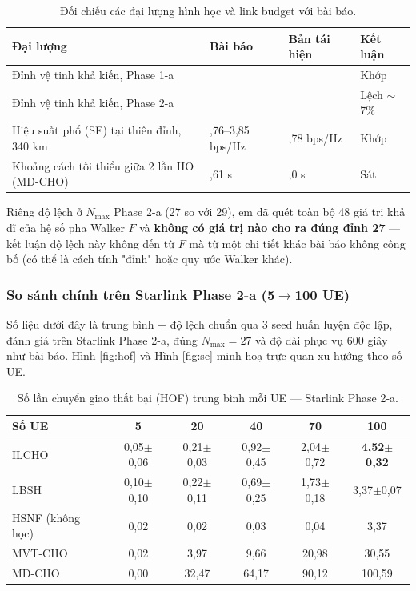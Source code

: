 \documentclass{article} %
\begin{document}
\begin{table}[h!]
\centering
\caption{Đối chiếu các đại lượng hình học và link budget với bài báo.}
\label{tab:sanity}
\begin{tabular}{|>{\raggedright\arraybackslash}p{5.2cm}|>{\raggedright\arraybackslash}p{3.2cm}|>{\raggedright\arraybackslash}p{2.8cm}|>{\centering\arraybackslash}p{1.6cm}|}
\hline
\textbf{Đại lượng} & \textbf{Bài báo} & \textbf{Bản tái hiện} & \textbf{Kết luận} \\
\hline
Đỉnh vệ tinh khả kiến, Phase 1-a & 17 & 17 & Khớp \\
\hline
Đỉnh vệ tinh khả kiến, Phase 2-a & 27 & 29 & Lệch $\sim$7\% \\
\hline
Hiệu suất phổ (SE) tại thiên đỉnh, 340 km & 3,76--3,85 bps/Hz & 3,78 bps/Hz & Khớp \\
\hline
Khoảng cách tối thiểu giữa 2 lần HO (MD-CHO) & 6,61 s & 8,0 s & Sát \\
\hline
\end{tabular}
\end{table}

Riêng độ lệch ở $N_{\max}$ Phase 2-a (27 so với 29), em đã quét toàn bộ 48 giá trị khả dĩ của hệ số pha Walker $F$ và \textbf{không có giá trị nào cho ra đúng đỉnh 27} — kết luận độ lệch này không đến từ $F$ mà từ một chi tiết khác bài báo không công bố (có thể là cách tính "đỉnh" hoặc quy ước Walker khác).

\subsubsection{So sánh chính trên Starlink Phase 2-a (5$\to$100 UE)}
Số liệu dưới đây là trung bình $\pm$ độ lệch chuẩn qua 3 seed huấn luyện độc lập, đánh giá trên Starlink Phase 2-a, đúng $N_{\max}=27$ và độ dài phục vụ 600 giây như bài báo. Hình \ref{fig:hof} và Hình \ref{fig:se} minh hoạ trực quan xu hướng theo số UE.

\begin{table}[h!]
\centering
\caption{Số lần chuyển giao thất bại (HOF) trung bình mỗi UE — Starlink Phase 2-a.}
\label{tab:hof-main}
\begin{tabular}{|l|c|c|c|c|c|}
\hline
\textbf{Số UE} & 5 & 20 & 40 & 70 & 100 \\
\hline
ILCHO & 0,05$\pm$0,06 & 0,21$\pm$0,03 & 0,92$\pm$0,45 & 2,04$\pm$0,72 & \textbf{4,52$\pm$0,32} \\
\hline
LBSH & 0,10$\pm$0,10 & 0,22$\pm$0,11 & 0,69$\pm$0,25 & 1,73$\pm$0,18 & 3,37$\pm$0,07 \\
\hline
HSNF (không học) & 0,02 & 0,02 & 0,03 & 0,04 & 3,37 \\
\hline
MVT-CHO & 0,02 & 3,97 & 9,66 & 20,98 & 30,55 \\
\hline
MD-CHO & 0,00 & 32,47 & 64,17 & 90,12 & 100,59 \\
\hline
\end{tabular}
\end{table}
\end{document}
